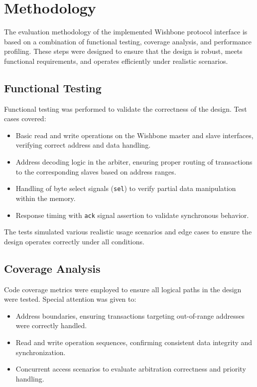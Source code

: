 \documentclass[conference]{IEEEtran}
\begin{document}



\section{Methodology}

The evaluation methodology of the implemented Wishbone protocol interface is based on a combination of functional testing, coverage analysis, and performance profiling. These steps were designed to ensure that the design is robust, meets functional requirements, and operates efficiently under realistic scenarios.

\subsection{Functional Testing}
Functional testing was performed to validate the correctness of the design. Test cases covered:
\begin{itemize}
    \item Basic read and write operations on the Wishbone master and slave interfaces, verifying correct address and data handling.
    \item Address decoding logic in the arbiter, ensuring proper routing of transactions to the corresponding slaves based on address ranges.
    \item Handling of byte select signals (\texttt{sel}) to verify partial data manipulation within the memory.
    \item Response timing with \texttt{ack} signal assertion to validate synchronous behavior.
\end{itemize}
The tests simulated various realistic usage scenarios and edge cases to ensure the design operates correctly under all conditions.

\subsection{Coverage Analysis}
Code coverage metrics were employed to ensure all logical paths in the design were tested. Special attention was given to:
\begin{itemize}
    \item Address boundaries, ensuring transactions targeting out-of-range addresses were correctly handled.
    \item Read and write operation sequences, confirming consistent data integrity and synchronization.
    \item Concurrent access scenarios to evaluate arbitration correctness and priority handling.
\end{itemize}
\end{document}
